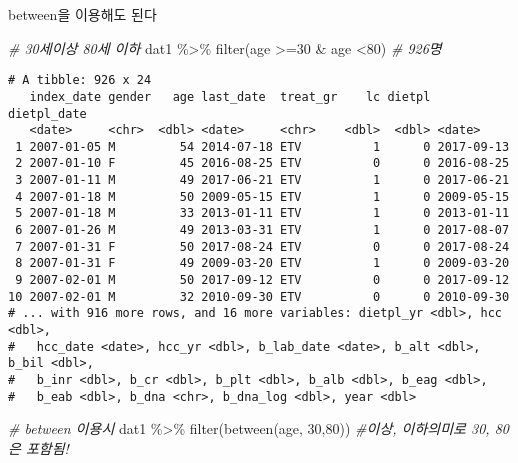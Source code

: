 \documentclass[
]{article}
\newenvironment{Shaded}{\begin{snugshade}}{\end{snugshade}}
\newcommand{\CommentTok}[1]{\textcolor[rgb]{0.56,0.35,0.01}{\textit{#1}}}
\newcommand{\DecValTok}[1]{\textcolor[rgb]{0.00,0.00,0.81}{#1}}
\newcommand{\FunctionTok}[1]{\textcolor[rgb]{0.00,0.00,0.00}{#1}}
\newcommand{\NormalTok}[1]{#1}
\newcommand{\SpecialCharTok}[1]{\textcolor[rgb]{0.00,0.00,0.00}{#1}}
\begin{document}
between을 이용해도 된다

\begin{Shaded}
\begin{Highlighting}[]
\CommentTok{\# 30세이상 80세 이하}
\NormalTok{dat1 }\SpecialCharTok{\%\textgreater{}\%} 
   \FunctionTok{filter}\NormalTok{(age }\SpecialCharTok{\textgreater{}=}\DecValTok{30} \SpecialCharTok{\&}\NormalTok{ age }\SpecialCharTok{\textless{}}\DecValTok{80}\NormalTok{) }\CommentTok{\# 926명}
\end{Highlighting}
\end{Shaded}

\begin{verbatim}
# A tibble: 926 x 24
   index_date gender   age last_date  treat_gr    lc dietpl dietpl_date
   <date>     <chr>  <dbl> <date>     <chr>    <dbl>  <dbl> <date>     
 1 2007-01-05 M         54 2014-07-18 ETV          1      0 2017-09-13 
 2 2007-01-10 F         45 2016-08-25 ETV          0      0 2016-08-25 
 3 2007-01-11 M         49 2017-06-21 ETV          1      0 2017-06-21 
 4 2007-01-18 M         50 2009-05-15 ETV          1      0 2009-05-15 
 5 2007-01-18 M         33 2013-01-11 ETV          1      0 2013-01-11 
 6 2007-01-26 M         49 2013-03-31 ETV          1      0 2017-08-07 
 7 2007-01-31 F         50 2017-08-24 ETV          0      0 2017-08-24 
 8 2007-01-31 F         49 2009-03-20 ETV          1      0 2009-03-20 
 9 2007-02-01 M         50 2017-09-12 ETV          0      0 2017-09-12 
10 2007-02-01 M         32 2010-09-30 ETV          0      0 2010-09-30 
# ... with 916 more rows, and 16 more variables: dietpl_yr <dbl>, hcc <dbl>,
#   hcc_date <date>, hcc_yr <dbl>, b_lab_date <date>, b_alt <dbl>, b_bil <dbl>,
#   b_inr <dbl>, b_cr <dbl>, b_plt <dbl>, b_alb <dbl>, b_eag <dbl>,
#   b_eab <dbl>, b_dna <chr>, b_dna_log <dbl>, year <dbl>
\end{verbatim}

\begin{Shaded}
\begin{Highlighting}[]
\CommentTok{\# between 이용시}
\NormalTok{dat1 }\SpecialCharTok{\%\textgreater{}\%} 
   \FunctionTok{filter}\NormalTok{(}\FunctionTok{between}\NormalTok{(age, }\DecValTok{30}\NormalTok{,}\DecValTok{80}\NormalTok{)) }\CommentTok{\#이상, 이하의미로 30, 80은 포함됨!}
\end{Highlighting}
\end{Shaded}
\end{document}
